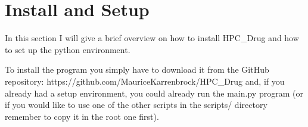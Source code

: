 

\section{Install and Setup}

	In this section I will give a brief overview on how to install HPC\_Drug and how to set up the python environment.
	
	To install the program you simply have to download it from the GitHub repository: https://github.com/MauriceKarrenbrock/HPC\_Drug and, if you already had a setup environment, you could already run the main.py program (or if you would like to use one of the other scripts in the scripts/ directory remember to copy it in the root one first).
	
